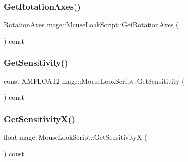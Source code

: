 \hypertarget{classmage_1_1_mouse_look_script_ae7ca5fd8fcfa1fbe6654bae9abc0c5b7}{}\label{classmage_1_1_mouse_look_script_ae7ca5fd8fcfa1fbe6654bae9abc0c5b7} 
\subsubsection{\texorpdfstring{Get\+Rotation\+Axes()}{GetRotationAxes()}}
{\footnotesize\ttfamily \hyperlink{namespacemage_a548e5c31b08a1078841ed21948f5bf4c}{Rotation\+Axes} mage\+::\+Mouse\+Look\+Script\+::\+Get\+Rotation\+Axes (\begin{DoxyParamCaption}{ }\end{DoxyParamCaption}) const}

\hypertarget{classmage_1_1_mouse_look_script_a942a751f1b6ed77bf2562b4f17dc108c}{}\label{classmage_1_1_mouse_look_script_a942a751f1b6ed77bf2562b4f17dc108c} 
\subsubsection{\texorpdfstring{Get\+Sensitivity()}{GetSensitivity()}}
{\footnotesize\ttfamily const X\+M\+F\+L\+O\+A\+T2 mage\+::\+Mouse\+Look\+Script\+::\+Get\+Sensitivity (\begin{DoxyParamCaption}{ }\end{DoxyParamCaption}) const}

\hypertarget{classmage_1_1_mouse_look_script_a5ba6c96a6d73050bc0c9903f376dbd93}{}\label{classmage_1_1_mouse_look_script_a5ba6c96a6d73050bc0c9903f376dbd93} 
\subsubsection{\texorpdfstring{Get\+Sensitivity\+X()}{GetSensitivityX()}}
{\footnotesize\ttfamily float mage\+::\+Mouse\+Look\+Script\+::\+Get\+SensitivityX (\begin{DoxyParamCaption}{ }\end{DoxyParamCaption}) const}

